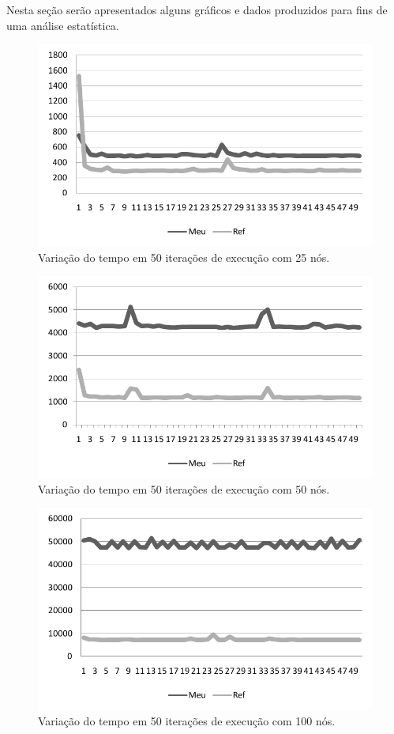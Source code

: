 \documentclass{acm_proc_article-sp}
\begin{document}
Nesta seção serão apresentados alguns gráficos e dados produzidos para fins de uma análise estatística.
 
\begin{figure}[ht]%
\centering
\includegraphics[scale=.3]{img/25nos.png}
\caption{Variação do tempo em 50 iterações de execução com 25 nós.}
\label{25nos}
\end{figure}

\begin{figure}[ht]%
\centering
\includegraphics[scale=.3]{img/50nos.png}
\caption{Variação do tempo em 50 iterações de execução com 50 nós.}
\label{50nos}
\end{figure}

\begin{figure}[ht]%
\centering
\includegraphics[scale=.3]{img/100nos.png}
\caption{Variação do tempo em 50 iterações de execução com 100 nós.}
\label{100nos}
\end{figure}
\end{document}
